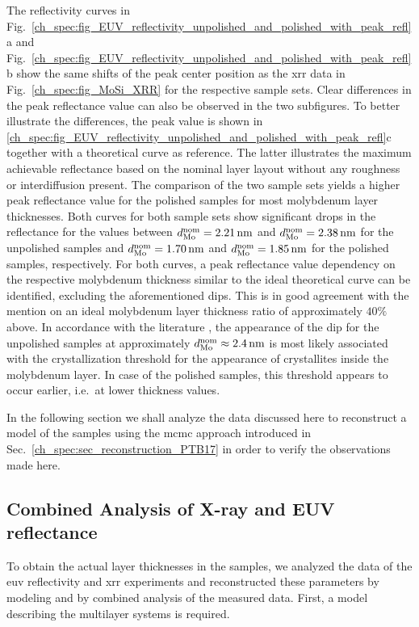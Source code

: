 The reflectivity curves in Fig.~\ref{ch_spec:fig_EUV_reflectivity_unpolished_and_polished_with_peak_refl}a and Fig.~\ref{ch_spec:fig_EUV_reflectivity_unpolished_and_polished_with_peak_refl}b show the same shifts of the peak center position as the \gls{xrr} data in Fig.~\ref{ch_spec:fig_MoSi_XRR} for the respective sample sets. Clear differences in the peak reflectance value can also be observed in the two subfigures. To better illustrate the differences, the peak value is shown in \ref{ch_spec:fig_EUV_reflectivity_unpolished_and_polished_with_peak_refl}c together with a theoretical curve as reference. The latter illustrates the maximum achievable reflectance based on the nominal layer layout without any roughness or interdiffusion present. The comparison of the two sample sets yields a higher peak reflectance value for the polished samples for most molybdenum layer thicknesses. Both curves for both sample sets show significant drops in the reflectance for the values between $d_\text{Mo}^\text{nom} = \nm{2.21}$ and $d_\text{Mo}^\text{nom} = \nm{2.38}$ for the unpolished samples and $d_\text{Mo}^\text{nom} = \nm{1.70}$ and $d_\text{Mo}^\text{nom} = \nm{1.85}$ for the polished samples, respectively. For both curves, a peak reflectance value dependency on the respective molybdenum thickness similar to the ideal theoretical curve can be identified, excluding the aforementioned dips. This is in good agreement with the mention on an ideal molybdenum layer thickness ratio of approximately $40\%$ above. In accordance with the literature \cite{bajt_investigation_2001}, the appearance of the dip for the unpolished samples at approximately $d_\text{Mo}^\text{nom} \approx \nm{2.4}$ is most likely associated with the crystallization threshold for the appearance of crystallites inside the molybdenum layer. In case of the polished samples, this threshold appears to occur earlier, i.e.~at lower thickness values.

In the following section we shall analyze the data discussed here to reconstruct a model of the samples using the \gls{mcmc} approach introduced in Sec.~\ref{ch_spec:sec_reconstruction_PTB17} in order to verify the observations made here.

\newpage
\subsection{Combined Analysis of X-ray and EUV reflectance}
To obtain the actual layer thicknesses in the samples, we analyzed the data of the \gls{euv} reflectivity and \gls{xrr} experiments and reconstructed these parameters by modeling and by combined analysis of the measured data. First, a model describing the multilayer systems is required.


